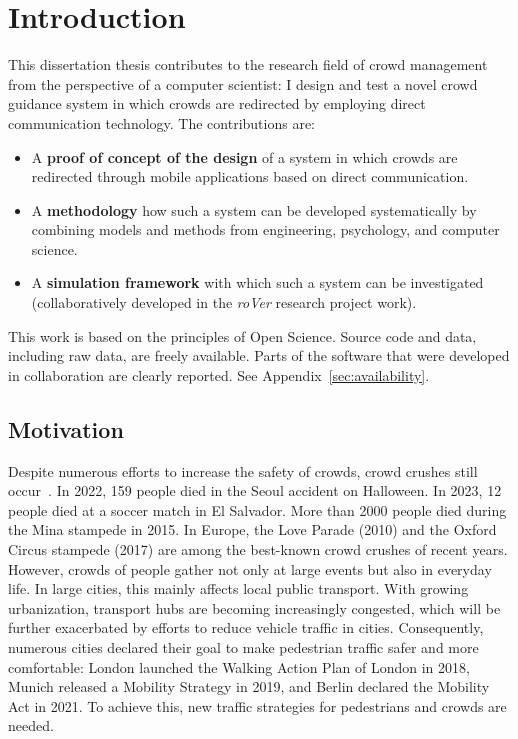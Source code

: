

\chapter{Introduction}

This dissertation thesis contributes to the research field of crowd management from the perspective of a computer scientist: I design and test a novel crowd guidance system in which crowds are redirected by employing direct communication technology. The contributions are:
\begin{itemize}
\item A \textbf{proof of concept of the design} of a system in which crowds are redirected through mobile applications based on direct communication.
\item A \textbf{methodology} how such a system can be developed systematically by combining models and methods from engineering, psychology, and computer science.
\item A \textbf{simulation framework} with which such a system can be investigated (collaboratively developed in the \textit{roVer} research project work).
\end{itemize}


\vspace{0.4cm}

\begin{tcolorbox}[title=Availability of data and software]
This work is based on the principles of Open Science. Source code and data, including raw data, are freely available. Parts of the software that were developed in collaboration are clearly reported. See Appendix~\ref{sec:availability}.
\end{tcolorbox}

\section{Motivation}

Despite numerous efforts to increase the safety of crowds, crowd crushes still occur~\cite{haghani-2018-cdyn}. In 2022, 159 people died in the Seoul accident on Halloween. In 2023, 12 people died at a soccer match in El Salvador. More than 2000 people died during the Mina stampede in 2015. In Europe, the Love Parade (2010) and the Oxford Circus stampede (2017) are among the best-known crowd crushes of recent years. 
However, crowds of people gather not only at large events but also in everyday life. In large cities, this mainly affects local public transport. With growing urbanization, transport hubs are becoming increasingly congested, which will be further exacerbated by efforts to reduce vehicle traffic in cities. Consequently, numerous cities declared their goal to make pedestrian traffic safer and more comfortable: London launched the Walking Action Plan of London in 2018, Munich released a Mobility Strategy in 2019, and Berlin declared the Mobility Act in 2021.  
To achieve this, new traffic strategies for pedestrians and crowds are needed.

